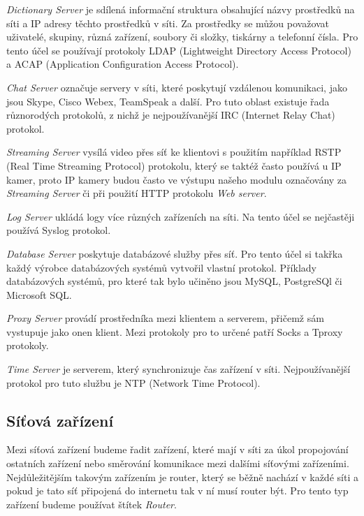 \documentclass[thesis=B,czech,hidelinks]{FITthesis}[2019/03/21]
\begin{document}
\begin{description}
            \item\emph{Dictionary Server}  je sdílená informační struktura obsahující názvy prostředků na síti a IP adresy těchto prostředků v síti. Za prostředky se můžou považovat uživatelé, skupiny, různá zařízení, soubory či složky, tiskárny a telefonní čísla. Pro tento účel se používají protokoly LDAP (Lightweight Directory Access Protocol) a ACAP (Application Configuration Access Protocol).
            
            \item\emph{Chat Server}  označuje servery v síti, které poskytují vzdálenou komunikaci, jako jsou Skype, Cisco Webex, TeamSpeak a další. Pro tuto oblast existuje řada různorodých protokolů, z nichž je nejpoužívanější IRC (Internet Relay Chat) protokol.
            
            \item\emph{Streaming Server} vysílá video přes síť ke klientovi s použitím například RSTP (Real Time Streaming Protocol) protokolu, který se taktéž často používá u IP kamer, proto IP kamery budou často ve výstupu našeho modulu označovány za \emph{Streaming Server} či při použití HTTP protokolu \emph{Web server}.
            
            \item\emph{Log Server}  ukládá logy více různých zařízeních na síti. Na tento účel se nejčastěji používá Syslog protokol. 
            
            \item\emph{Database Server}  poskytuje databázové služby přes síť. Pro tento účel si takřka každý výrobce databázových systémů vytvořil vlastní protokol. Příklady databázových systémů, pro které tak bylo učiněno jsou MySQL, PostgreSQl či Microsoft SQL.
            
            \item\emph{Proxy Server}  provádí prostředníka mezi klientem a serverem, přičemž sám vystupuje jako onen klient. Mezi protokoly pro to určené patří Socks a Tproxy protokoly.
            
            \item\emph{Time Server}  je serverem, který synchronizuje čas zařízení v síti. Nejpoužívanější protokol pro tuto službu je NTP (Network Time Protocol).
            
        \end{description}
        \subsection{Síťová zařízení}
        Mezi síťová zařízení budeme řadit zařízení, které mají v síti za úkol propojování ostatních zařízení nebo směrování komunikace mezi dalšími síťovými zařízeními. Nejdůležitějším takovým zařízením je router, který se běžně nachází v každé síti a pokud je tato síť připojená do internetu tak v ní musí router být. Pro tento typ zařízení budeme používat štítek \emph{Router}. 
        
\end{document}

